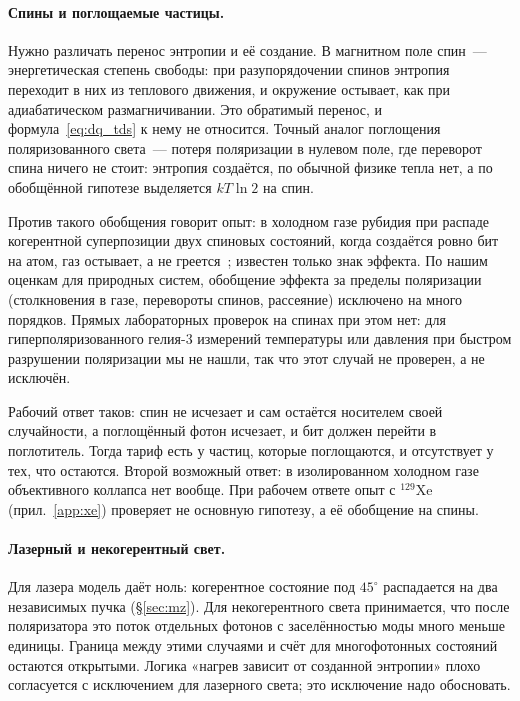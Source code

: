 \documentclass[11pt,a4paper]{article}
\newcommand{\Sref}[1]{\hyperref[#1]{\S\ref{#1}}}
\begin{document}
\paragraph{Спины и поглощаемые частицы.}
Нужно различать перенос энтропии и её создание. В магнитном поле спин~--- энергетическая степень свободы: при разупорядочении спинов энтропия переходит в них из теплового движения, и окружение остывает, как при адиабатическом размагничивании. Это обратимый перенос, и формула~\eqref{eq:dq_tds} к нему не относится. Точный аналог поглощения поляризованного света~--- потеря поляризации в нулевом поле, где переворот спина ничего не стоит: энтропия создаётся, по обычной физике тепла нет, а по обобщённой гипотезе выделяется $kT\ln 2$ на спин.

Против такого обобщения говорит опыт: в холодном газе рубидия при распаде когерентной суперпозиции двух спиновых состояний, когда создаётся ровно бит на атом, газ остывает, а не греется~\cite{lewandowski2003}; известен только знак эффекта. По нашим оценкам для природных систем, обобщение эффекта за пределы поляризации (столкновения в газе, перевороты спинов, рассеяние) исключено на много порядков. Прямых лабораторных проверок на спинах при этом нет: для гиперполяризованного гелия-3 измерений температуры или давления при быстром разрушении поляризации мы не нашли, так что этот случай не проверен, а не исключён.

Рабочий ответ таков: спин не исчезает и сам остаётся носителем своей случайности, а поглощённый фотон исчезает, и бит должен перейти в поглотитель. Тогда тариф есть у частиц, которые поглощаются, и отсутствует у тех, что остаются. Второй возможный ответ: в изолированном холодном газе объективного коллапса нет вообще. При рабочем ответе опыт с $^{129}$Xe (прил.~\ref{app:xe}) проверяет не основную гипотезу, а её обобщение на спины.

\paragraph{Лазерный и некогерентный свет.}
Для лазера модель даёт ноль: когерентное состояние под $45^\circ$ распадается на два независимых пучка (\Sref{sec:mz}). Для некогерентного света принимается, что после поляризатора это поток отдельных фотонов с заселённостью моды много меньше единицы. Граница между этими случаями и счёт для многофотонных состояний остаются открытыми. Логика «нагрев зависит от созданной энтропии» плохо согласуется с исключением для лазерного света; это исключение надо обосновать.
\end{document}

